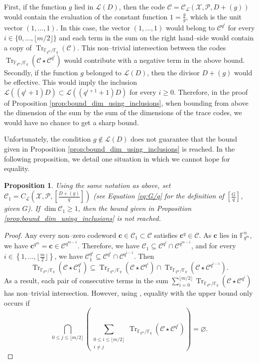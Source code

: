 \documentclass[a4paper]{article}
\newtheorem{proposition}[thm]{Proposition}
\theoremstyle{definition}
\theoremstyle{remark}
\newcommand{\calP}{\mathcal{P}}
\newcommand{\calL}{\mathcal{L}}
\newcommand{\calC}{\mathcal{C}}
\newcommand{\calX}{\mathcal{X}}
\newcommand{\fqm}{\mathbb{F}_{q^m}}
\newcommand{\fq}{\mathbb{F}_{q}}
\newcommand{\Tr}[1]{\operatorname{Tr}_{\mathbb{F}_{q^m}/\fq}\left(#1\right)}
\newcommand{\set}[1]{\left\{#1\right\}}
\begin{document}
First, if the function $g$ lied in $\calL(D)$, then the code $\calC= \calC_{\calL}(\calX,\calP,D+(g))$ would contain the evaluation of the constant function $1=\frac{g}{g}$, which is the unit vector $(1,\dots,1)$. In this case, the vector $(1,\dots,1)$ would belong to $\calC^{q^i}$ for every $i \in \{0,\dots, \lfloor{m/2} \rfloor\}$ and each term in the sum on the right hand--side would contain a copy of $\Tr{\calC}$. This non--trivial intersection between the codes $\Tr{\calC\star \calC^{q^i}}$ would contribute with a negative term in the above bound.
Secondly, if the function $g$ belonged to $\calL(D)$, then the divisor $D+(g)$ would be effective. This would imply the inclusion $\calL((q^i+1)D) \subset \calL((q^{i+1}+1)D)$ for every $i \geq 0$. Therefore, in the proof of Proposition \ref{prop:bound_dim_using_inclusions}, when bounding from above the dimension of the sum by the sum of the dimensions of the trace codes, we would have no chance to get a sharp bound.

Unfortunately, the condition $g \notin \calL(D)$ does not guarantee that the bound given in Proposition \ref{prop:bound_dim_using_inclusions} is reached. In the following proposition, we detail one situation in which we cannot hope for equality.

\begin{proposition}\label{prop:non-eq}
	Using the same notation as above, set $\calC_1=C_{\calL}\left(\calX,\mathcal{P},\left[ \frac{D+(g)}{q} \right]\right)$ (see Equation \eqref{eq:G/q} for the definition of $\left[ \frac{G}{q} \right]$, given $G$). If $\dim \calC_1 \geq 1$, then the bound given in Proposition \ref{prop:bound_dim_using_inclusions} is not reached.
\end{proposition}

\begin{proof}
Any every non--zero codeword $\mathbf{c} \in  \calC_1 \subset \calC$ satisfies $\mathbf{c}^q \in \calC$. As $\mathbf{c}$ lies in $\fqm^n$, we have $\mathbf{c}^{q^m}=\mathbf{c} \in \calC^{q^{m-1}}$. Therefore,  we have $\calC_1 \subseteq \calC^{q^i} \cap \calC^{q^{m-1}}$, and for every $i \in \set{1,\dots,\lfloor \frac{m}{2}\rfloor}$, we have $\calC_1^{q^i} \subseteq \calC^{q^i} \cap \calC^{q^{i-1}}$. Then
\[\Tr{\calC\star\calC_1^{q^i}} \subseteq \Tr{\calC\star\calC^{q^i}} \cap \Tr{\calC\star\calC^{q^{i-1}}}.\]
As a result, each pair of consecutive terms in the sum $\sum\limits_{i=0}^{\lfloor m/2 \rfloor} \Tr{\calC \star \calC^{q^i}}$ has non--trivial intersection. However, using \cite[Theorem~2]{T19}, equality with the upper bound only occurs if
\[\bigcap_{0\leq j \leq \lfloor m/2\rfloor} \left( \sum_{\substack{0\leq i \leq \lfloor m/2 \rfloor\\ i\neq j}} \Tr{\calC \star \calC^{q^i}} \right)= \varnothing.\]
\end{proof}
\end{document}
